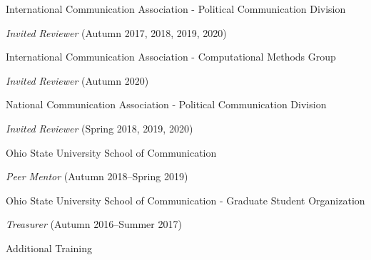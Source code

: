 \documentclass[letterpaper, 10pt]{extarticle}
\renewenvironment{itemize}{
  \begin{list}{}{
    \setlength{\leftmargin}{10pt}
  }
}{
  \end{list}
}
\begin{document}
\begin{itemize}
\item International Communication Association - Political Communication Division
\vspace{-10pt}
\begin{itemize}
\item \textit{Invited Reviewer} (Autumn 2017, 2018, 2019, 2020)
\end{itemize}
\item International Communication Association - Computational Methods Group
\vspace{-10pt}
\begin{itemize}
\item \textit{Invited Reviewer} (Autumn 2020)
\end{itemize}
\item National Communication Association - Political Communication Division
\vspace{-10pt}
\begin{itemize}
\item \textit{Invited Reviewer} (Spring 2018, 2019, 2020)
\end{itemize}
\item Ohio State University School of Communication
\vspace{-10pt}
\begin{itemize}
\item \textit{Peer Mentor} (Autumn 2018--Spring 2019)
\end{itemize}
\item Ohio State University School of Communication - Graduate Student Organization
\vspace{-10pt}
\begin{itemize}
\item \textit{Treasurer} (Autumn 2016--Summer 2017)
\end{itemize}
\end{itemize}

\vspace{0.3em}
{\large Additional Training}
\end{document}

